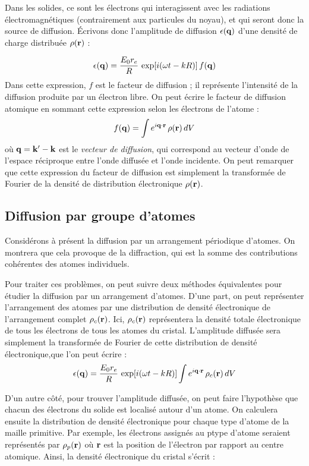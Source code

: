 Dans les solides, ce sont les électrons qui interagissent avec les radiations électromagnétiques (contrairement aux particules du noyau), et qui seront donc la source de diffusion. Écrivons donc l'amplitude de diffusion
$\epsilon(\mathbf{q})$ d'une densité de charge distribuée $\rho(\mathbf{r})$ :

\begin{equation}
    \epsilon(\mathbf{q}) = \frac{E_0 r_e}{R}\, \exp [i(\omega t - k R)]  \, f(\mathbf{q})
\end{equation}
Dans cette expression, $f$ est le facteur de diffusion ; il représente l'intensité de la diffusion produite par un électron libre. On peut écrire le facteur de diffusion atomique en sommant cette expression selon les électrons de l'atome :
\begin{equation}
    f(\mathbf{q}) = \int e^{i\mathbf{q}\cdot\mathbf{r}}\, \rho(\mathbf{r}) \,dV
\end{equation}
où $\mathbf{q = k' - k}$ est le \emph{vecteur de diffusion}, qui correspond au vecteur d'onde de l'espace réciproque entre
l'onde diffusée et l'onde incidente. On peut remarquer que cette expression du facteur de diffusion est simplement la transformée de Fourier de la densité de distribution électronique $\rho(\mathbf{r})$.

\subsection{Diffusion par groupe d'atomes}

Considérons à présent la diffusion par un arrangement périodique d'atomes. On montrera que cela provoque de la diffraction, qui est la somme des contributions cohérentes des atomes individuels.

Pour traiter ces problèmes, on peut suivre deux méthodes équivalentes pour étudier la diffusion par un arrangement d'atomes.
D'une part, on peut représenter l'arrangement des atomes par une distribution de densité électronique de l'arrangement complet $\rho_c(\mathbf{r})$. Ici, $\rho_c(\mathbf{r})$ représentera la densité totale électronique de tous les électrons de tous les atomes du cristal. L'amplitude diffusée sera simplement la transformée de Fourier de cette distribution de densité électronique,que l'on peut écrire :
\begin{equation}
    \epsilon(\mathbf{q}) = \frac{E_0 r_e}{R}\, \exp [i(\omega t - k R)] \int e^{i \mathbf{q \cdot r}} \, \rho_c (\mathbf{r})\, dV
    \label{fftdistrelec}
\end{equation}

D'un autre côté, pour trouver l'amplitude diffusée, on peut faire l'hypothèse que chacun des électrons du solide est localisé autour d'un atome. On calculera ensuite la distribution de densité électronique pour chaque type d'atome de la maille primitive. Par exemple, les
électrons assignés au p\ieme type d'atome seraient représentés par $\rho_p(\mathbf{r})$ où $\mathbf{r}$ est la position de l'électron par rapport au centre atomique. Ainsi, la densité électronique du cristal s'écrit :

